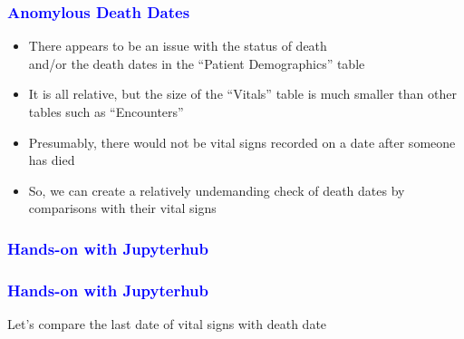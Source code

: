 \documentclass[11pt,pdftex,dvipsnames,usenames]{beamer}
\begin{document}
\begin{frame}[fragile]\frametitle{\bf\textcolor{blue}{Anomylous Death Dates}}
\begin{itemize}
\item There appears to be an issue with the status of death\\
and/or the death dates in the ``Patient Demographics'' table
\item It is all relative, but the size of the ``Vitals'' table is much smaller
than other tables such as ``Encounters''
\item Presumably, there would not be vital signs recorded on a date after someone has died
\item So, we can create a relatively undemanding check of death dates
by comparisons with their vital signs 
\end{itemize}
\end{frame}


\begin{frame}[fragile]\frametitle{\bf\textcolor{blue}{Hands-on with Jupyterhub}}

\end{frame}


\begin{frame}[fragile]\frametitle{\bf\textcolor{blue}{Hands-on with Jupyterhub}}
Let's compare the last date of vital signs with death date

\end{frame}
\end{document}
